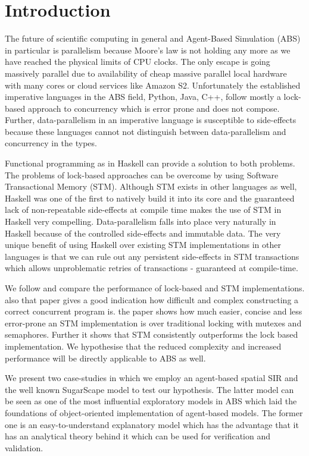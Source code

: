 \section{Introduction} %
The future of scientific computing in general and Agent-Based Simulation (ABS) in particular is parallelism because Moore's law is not holding any more as we have reached the physical limits of CPU clocks. The only escape is going massively parallel due to availability of cheap massive parallel local hardware with many cores or cloud services like Amazon S2. Unfortunately the established imperative languages in the ABS field, Python, Java, C++, follow mostly a lock-based approach to concurrency which is error prone and does not compose. Further, data-parallelism in an imperative language is susceptible to side-effects because these languages cannot not distinguish between data-parallelism and concurrency in the types. 

Functional programming as in Haskell can provide a solution to both problems. The problems of lock-based approaches can be overcome by using Software Transactional Memory (STM). Although STM exists in other languages as well, Haskell was one of the first to natively build it into its core and the guaranteed lack of non-repeatable side-effects at compile time makes the use of STM in Haskell very compelling. Data-parallelism falls into place very naturally in Haskell because of the controlled side-effects and immutable data. The very unique benefit of using Haskell over existing STM implementations in other languages is that we can rule out any persistent side-effects in STM transactions which allows unproblematic retries of transactions - guaranteed at compile-time.

We follow \cite{discolo_lock_2006} and compare the performance of lock-based and STM implementations.  also that paper gives a good indication how difficult and complex constructing a correct concurrent program is. the paper shows how much easier, concise and less error-prone an STM implementation is over traditional locking with mutexes and semaphores. Further it shows that STM consistently outperforms the lock based implementation. We hypothesise that the reduced complexity and increased performance will be directly applicable to ABS as well.

We present two case-studies in which we employ an agent-based spatial SIR \citep{macal_agent-based_2010} and the well known SugarScape \citep{epstein_growing_1996} model to test our hypothesis. The latter model can be seen as one of the most influential exploratory models in ABS which laid the foundations of object-oriented implementation of agent-based models. The former one is an easy-to-understand explanatory model which has the advantage that it has an analytical theory behind it which can be used for verification and validation. 

